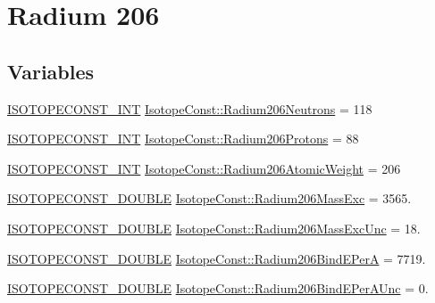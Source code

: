 \hypertarget{group___isotope_const-_radium-_ra206}{}\section{Radium 206}
\label{group___isotope_const-_radium-_ra206}
\subsection*{Variables}
\begin{DoxyCompactItemize}
\item 
\mbox{\hyperlink{group___isotope_const-_macros_ga5f18360b3e99483a35c32d789e62621c}{I\+S\+O\+T\+O\+P\+E\+C\+O\+N\+S\+T\+\_\+\+I\+NT}} \mbox{\hyperlink{group___isotope_const-_radium-_ra206_gaabad4dc8fe30ac5f9a5b5e8e8949e83d}{Isotope\+Const\+::\+Radium206\+Neutrons}} = 118
\item 
\mbox{\hyperlink{group___isotope_const-_macros_ga5f18360b3e99483a35c32d789e62621c}{I\+S\+O\+T\+O\+P\+E\+C\+O\+N\+S\+T\+\_\+\+I\+NT}} \mbox{\hyperlink{group___isotope_const-_radium-_ra206_ga03c631f3f13703f58c584a911c178d74}{Isotope\+Const\+::\+Radium206\+Protons}} = 88
\item 
\mbox{\hyperlink{group___isotope_const-_macros_ga5f18360b3e99483a35c32d789e62621c}{I\+S\+O\+T\+O\+P\+E\+C\+O\+N\+S\+T\+\_\+\+I\+NT}} \mbox{\hyperlink{group___isotope_const-_radium-_ra206_gae7a5c8861c1ee1607f31058204b2b57c}{Isotope\+Const\+::\+Radium206\+Atomic\+Weight}} = 206
\item 
\mbox{\hyperlink{group___isotope_const-_macros_ga8f45a7272ce02c0b4c65c44636ed719a}{I\+S\+O\+T\+O\+P\+E\+C\+O\+N\+S\+T\+\_\+\+D\+O\+U\+B\+LE}} \mbox{\hyperlink{group___isotope_const-_radium-_ra206_ga12326e2758f307b93ea9a2391c514f68}{Isotope\+Const\+::\+Radium206\+Mass\+Exc}} = 3565.
\item 
\mbox{\hyperlink{group___isotope_const-_macros_ga8f45a7272ce02c0b4c65c44636ed719a}{I\+S\+O\+T\+O\+P\+E\+C\+O\+N\+S\+T\+\_\+\+D\+O\+U\+B\+LE}} \mbox{\hyperlink{group___isotope_const-_radium-_ra206_gaf128cc3390fc74df3aa1335f4b0b156f}{Isotope\+Const\+::\+Radium206\+Mass\+Exc\+Unc}} = 18.
\item 
\mbox{\hyperlink{group___isotope_const-_macros_ga8f45a7272ce02c0b4c65c44636ed719a}{I\+S\+O\+T\+O\+P\+E\+C\+O\+N\+S\+T\+\_\+\+D\+O\+U\+B\+LE}} \mbox{\hyperlink{group___isotope_const-_radium-_ra206_ga986cf988144a3d37e677800ae38bf98e}{Isotope\+Const\+::\+Radium206\+Bind\+E\+PerA}} = 7719.
\item 
\mbox{\hyperlink{group___isotope_const-_macros_ga8f45a7272ce02c0b4c65c44636ed719a}{I\+S\+O\+T\+O\+P\+E\+C\+O\+N\+S\+T\+\_\+\+D\+O\+U\+B\+LE}} \mbox{\hyperlink{group___isotope_const-_radium-_ra206_ga314d756919a49e34078be96c342d828c}{Isotope\+Const\+::\+Radium206\+Bind\+E\+Per\+A\+Unc}} = 0.

\end{DoxyCompactItemize}
